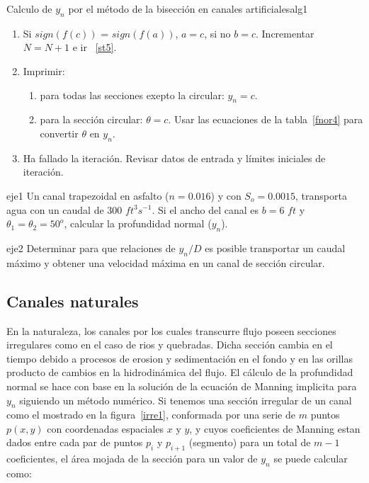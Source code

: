 \documentclass[11pt, oneside]{article}
\begin{document}
\begin{alg}{Calculo de $y_n$ por el m\'etodo de la bisecci\'on en canales artificiales}{alg1}
\begin{enumerate}
\item \label{st4} Si $sign(f(c))$ = $sign(f(a))$, $a=c$, si no $b=c$. Incrementar $N=N+1$ e ir ~\ref{st5}. 

\item \label{st2} Imprimir:
\begin{enumerate}
\item para todas las secciones exepto la circular: $y_n = c$.
\item para la secci\'on circular: $\theta = c$. Usar las ecuaciones de la tabla~\ref{fnor4} para convertir $\theta$ en $y_n$.
\end{enumerate}

\item \label{st3} Ha fallado la iteraci\'on. Revisar datos de entrada y l\'imites iniciales de iteraci\'on.

\end{enumerate}
\end{alg}

\begin{eje}{}{eje1}
Un canal trapezoidal en asfalto ($n=0.016$) y con $S_o = 0.0015$, transporta agua con un caudal de 300 $ft^3 s^{-1}$. Si el ancho del canal es $b=6$ $ft$ y $\theta_1 = \theta_2 = 50^o$, calcular la profundidad normal ($y_n$).
\end{eje}

\begin{eje}{}{eje2}
Determinar para que relaciones de $y_n /D$ es posible transportar un caudal m\'aximo y obtener una velocidad m\'axima en un canal de secci\'on circular.
\end{eje}

\subsection{Canales naturales}
En la naturaleza, los canales por los cuales transcurre flujo poseen secciones irregulares como en el caso de rios y quebradas. Dicha secci\'on cambia en el tiempo debido a procesos de erosion y sedimentaci\'on en el fondo y en las orillas producto de cambios en la hidrodin\'amica del flujo. El c\'alculo de la profundidad normal se hace con base en la soluci\'on de la ecuaci\'on de Manning implicita para $y_n$ siguiendo un m\'etodo num\'erico. Si tenemos una secci\'on irregular de un canal como el mostrado en la figura~\ref{irre1}, conformada por una serie de $m$ puntos $p(x,y)$ con coordenadas espaciales $x$ y $y$, y cuyos coeficientes de Manning estan dados entre cada par de puntos $p_i$ y $p_{i+1}$ (segmento) para un total de $m-1$ coeficientes, el \'area mojada de la secci\'on para un valor de $y_n$ se puede calcular como:
\end{document}
